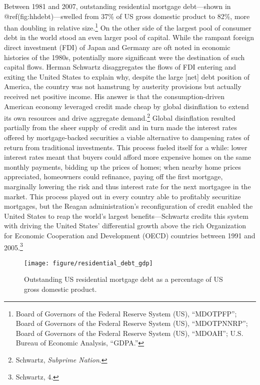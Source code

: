 \documentclass[
]{article}
\let\rmarkdownfootnote\footnote%
\def\footnote{\protect\rmarkdownfootnote}
\begin{document}
Between 1981 and 2007, outstanding residential mortgage debt---shown in
@ref(fig:hhdebt)---swelled from 37\% of US gross domestic product to
82\%, more than doubling in relative size.\footnote{Board of Governors
  of the Federal Reserve System (US), ``MDOTPFP''; Board of Governors of
  the Federal Reserve System (US), ``MDOTPNNRP''; Board of Governors of
  the Federal Reserve System (US), ``MDOAH''; U.S. Bureau of Economic
  Analysis, ``GDPA.''} On the other side of the largest pool of consumer
debt in the world stood an even larger pool of capital. While the
rampant foreign direct investment (FDI) of Japan and Germany are oft
noted in economic histories of the 1980s, potentially more significant
were the destination of such capital flows. Herman Schwartz
disaggregates the flows of FDI entering and exiting the United States to
explain why, despite the large {[}net{]} debt position of America, the
country was not hamstrung by austerity provisions but actually received
net positive income. His answer is that the consumption-driven American
economy leveraged credit made cheap by global disinflation to extend its
own resources and drive aggregate demand.\footnote{Schwartz,
  \emph{Subprime Nation}.} Global disinflation resulted partially from
the sheer supply of credit and in turn made the interest rates offered
by mortgage-backed securities a viable alternative to dampening rates of
return from traditional investments. This process fueled itself for a
while: lower interest rates meant that buyers could afford more
expensive homes on the same monthly payments, bidding up the prices of
homes; when nearby home prices appreciated, homeowners could refinance,
paying off the first mortgage, marginally lowering the risk and thus
interest rate for the next mortgagee in the market. This process played
out in every country able to profitably securitize mortgages, but the
Reagan administration's reconfiguration of credit enabled the United
States to reap the world's largest benefits---Schwartz credits this
system with driving the United States' differential growth above the
rich Organization for Economic Cooperation and Development (OECD)
countries between 1991 and 2005.\footnote{Schwartz, 4.}

\begin{figure}

{\centering \texttt{[image: figure/residential\_debt\_gdp]}

}

\caption{Outstanding US residential mortgage debt as a percentage of US gross domestic product.}\label{fig:hhdebt}
\end{figure}
\end{document}
